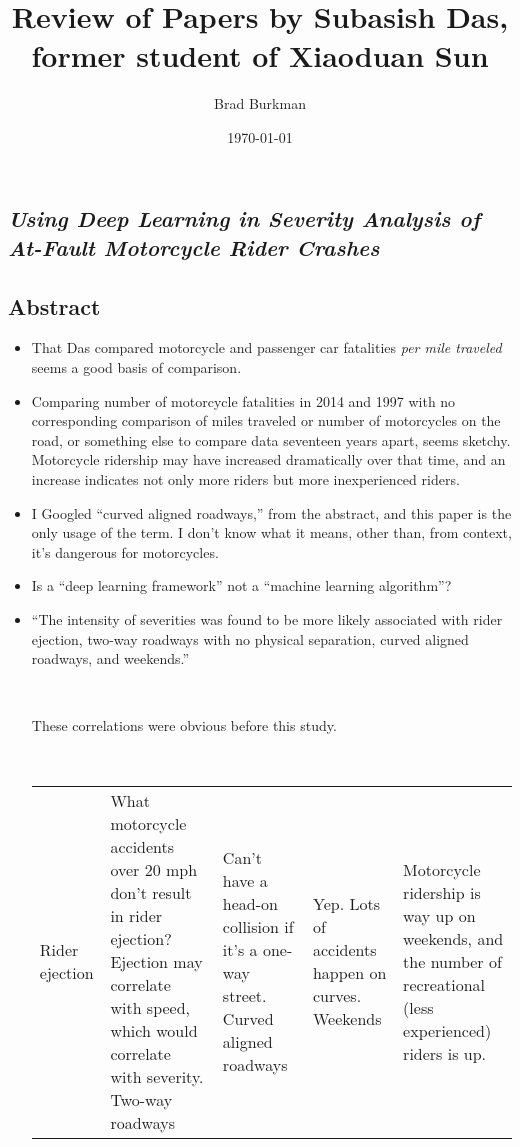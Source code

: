 \documentclass[11pt]{article}
\title{Review of Papers by Subasish Das, former student of Xiaoduan Sun}
\author{Brad Burkman}
\date{\today}
\begin{document}
\setlength{\parindent}{20pt}
\begin{spacing}{1.2}
\maketitle
\tableofcontents

\section{\it Using Deep Learning in Severity Analysis of At-Fault Motorcycle Rider Crashes}

\subsection{Abstract}

\begin{itemize}
	\item That Das compared motorcycle and passenger car fatalities {\it per mile traveled} seems a good basis of comparison.  
	\item Comparing number of motorcycle fatalities in 2014 and 1997 with no corresponding comparison of miles traveled or number of motorcycles on the road, or something else to compare data seventeen years apart, seems sketchy.  Motorcycle ridership may have increased dramatically over that time, and an increase indicates not only more riders but more inexperienced riders.  
	\item I Googled ``curved aligned roadways,'' from the abstract, and this paper is the only usage of the term.  I don't know what it means, other than, from context, it's dangerous for motorcycles.  
	\item Is a ``deep learning framework'' not a ``machine learning algorithm''?
	\item ``The intensity of severities was found to be
more likely associated with rider ejection, two-way roadways with no physical separation, curved aligned roadways, and weekends.''
	
	\
	
	These correlations were obvious before this study.  
	
	\
	
	\begin{tabular}{lp{4in}}
		Rider ejection & What motorcycle accidents over 20 mph don't result in rider ejection?  Ejection may correlate with speed, which would correlate with severity.\cr
		Two-way roadways & Can't have a head-on collision if it's a one-way street. \cr
		Curved aligned roadways & Yep.  Lots of accidents happen on curves. \cr
		Weekends & Motorcycle ridership is way up on weekends, and the number of recreational (less experienced) riders is up. \cr
	\end{tabular}	
\end{itemize}


\end{spacing}
\end{document}
